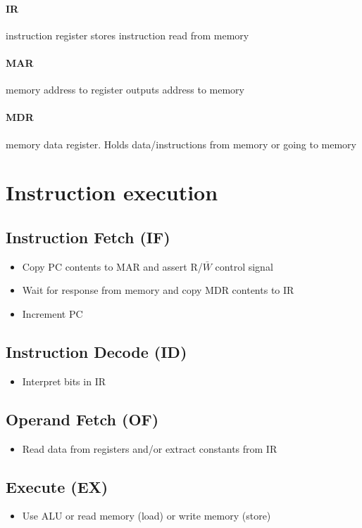 \documentclass[12pt]{report}
\begin{document}
    \paragraph{IR} instruction register stores instruction read from memory
    \paragraph{MAR} memory address to register outputs address to memory
    \paragraph{MDR} memory data register. Holds data/instructions from memory
    or going to memory

  \section{Instruction execution}
    \subsection{Instruction Fetch (IF)}
      \begin{itemize}
        \item Copy PC contents to MAR and assert R/$\bar{W}$ control signal
        \item Wait for response from memory and copy MDR contents to IR
        \item Increment PC
      \end{itemize}

    \subsection{Instruction Decode (ID)}
      \begin{itemize}
        \item Interpret bits in IR
      \end{itemize}

    \subsection{Operand Fetch (OF)}
      \begin{itemize}
        \item Read data from registers and/or extract constants from IR
      \end{itemize}

    \subsection{Execute (EX)}
      \begin{itemize}
        \item Use ALU or read memory (load) or write memory (store)
      \end{itemize}
\end{document}
